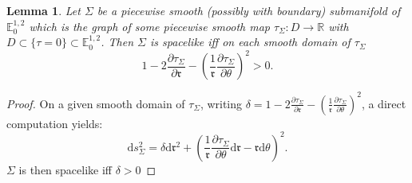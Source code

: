 \documentclass[a4paper,12pt]{article}
\def\r{\mathfrak{r}}
\def\R{\mathbb{R}}
\def\d{\mathrm{d}}
\newcommand{\mass}[1]{{\mathbb E}^{1,2}_{#1}}
\newtheorem{lemou}{Lemma}[section]          %
\begin{document}
    
     \begin{lemou}\label{btzlem:surface_causal} \label{lem:surface_causal} Let $\Sigma$ be a piecewise smooth (possibly with boundary) submanifold of $\mass{0}$ which is the graph of some piecewise smooth map $\tau_\Sigma: D \rightarrow \R$ with $D\subset \{\tau=0\}\subset \mass{0}$.
     Then $\Sigma$ is spacelike iff on each smooth domain of $\tau_\Sigma$  $$\displaystyle 1-2\frac{\partial \tau_\Sigma}{\partial \r}-\left(\frac{1}{\r}\frac{\partial \tau_\Sigma}{\partial \theta}\right)^2 >0.$$

      \end{lemou}
      \begin{proof}      
            On a given smooth domain of $\tau_\Sigma$, writing   $\delta =1-2\frac{\partial \tau_\Sigma}{\partial \r}-\left(\frac{1}{\r}\frac{\partial \tau_\Sigma}{\partial \theta}\right)^2$,  
            a direct computation yields: 
            $$\d s_\Sigma^2 =\delta \d \r^2 + \left(\frac{1}{\r}\frac{\partial\tau_\Sigma }{\partial \theta}\d \r-\r \d \theta \right)^2.$$
      $\Sigma$ is then spacelike iff $\delta>0$ 




%           
      \end{proof}
\end{document}
